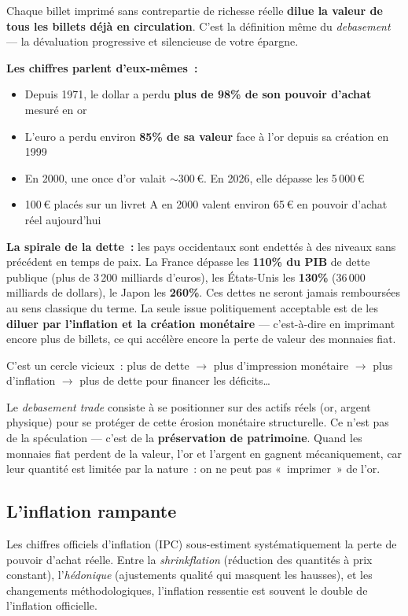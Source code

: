 \documentclass[14pt,a4paper]{extarticle}
\begin{document}
Chaque billet imprimé sans contrepartie de richesse réelle \textbf{dilue la valeur de tous les billets déjà en circulation}. C'est la définition même du \textit{debasement} --- la dévaluation progressive et silencieuse de votre épargne.

\textbf{Les chiffres parlent d'eux-mêmes~:}
\begin{itemize}
  \item Depuis 1971, le dollar a perdu \textbf{plus de 98\% de son pouvoir d'achat} mesuré en or
  \item L'euro a perdu environ \textbf{85\% de sa valeur} face à l'or depuis sa création en 1999
  \item En 2000, une once d'or valait $\sim$300\,€. En 2026, elle dépasse les 5\,000\,€
  \item 100\,€ placés sur un livret A en 2000 valent environ 65\,€ en pouvoir d'achat réel aujourd'hui
\end{itemize}

\textbf{La spirale de la dette~:} les pays occidentaux sont endettés à des niveaux sans précédent en temps de paix. La France dépasse les \textbf{110\% du PIB} de dette publique (plus de 3\,200 milliards d'euros), les États-Unis les \textbf{130\%} (36\,000 milliards de dollars), le Japon les \textbf{260\%}. Ces dettes ne seront jamais remboursées au sens classique du terme. La seule issue politiquement acceptable est de les \textbf{diluer par l'inflation et la création monétaire} --- c'est-à-dire en imprimant encore plus de billets, ce qui accélère encore la perte de valeur des monnaies fiat.

C'est un cercle vicieux~: plus de dette $\rightarrow$ plus d'impression monétaire $\rightarrow$ plus d'inflation $\rightarrow$ plus de dette pour financer les déficits\ldots

Le \textit{debasement trade} consiste à se positionner sur des actifs réels (or, argent physique) pour se protéger de cette érosion monétaire structurelle. Ce n'est pas de la spéculation --- c'est de la \textbf{préservation de patrimoine}. Quand les monnaies fiat perdent de la valeur, l'or et l'argent en gagnent mécaniquement, car leur quantité est limitée par la nature~: on ne peut pas «~imprimer~» de l'or.

\subsection{L'inflation rampante}

Les chiffres officiels d'inflation (IPC) sous-estiment systématiquement la perte de pouvoir d'achat réelle. Entre la \textit{shrinkflation} (réduction des quantités à prix constant), l'\textit{hédonique} (ajustements qualité qui masquent les hausses), et les changements méthodologiques, l'inflation ressentie est souvent le double de l'inflation officielle.
\end{document}
